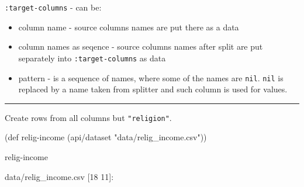 \documentclass[]{article}
\newenvironment{Shaded}{\begin{snugshade}}{\end{snugshade}}
\newcommand{\BuiltInTok}[1]{#1}
\newcommand{\FunctionTok}[1]{\textcolor[rgb]{0.00,0.00,0.00}{#1}}
\newcommand{\NormalTok}[1]{#1}
\newcommand{\StringTok}[1]{\textcolor[rgb]{0.31,0.60,0.02}{#1}}
\providecommand{\tightlist}{%
  \setlength{\itemsep}{0pt}\setlength{\parskip}{0pt}}
\begin{document}
\texttt{:target-columns} - can be:

\begin{itemize}
\tightlist
\item
  column name - source columns names are put there as a data
\item
  column names as seqence - source columns names after split are put
  separately into \texttt{:target-columns} as data
\item
  pattern - is a sequence of names, where some of the names are
  \texttt{nil}. \texttt{nil} is replaced by a name taken from splitter
  and such column is used for values.
\end{itemize}

\begin{center}\rule{0.5\linewidth}{0.5pt}\end{center}

Create rows from all columns but \texttt{"religion"}.

\begin{Shaded}
\begin{Highlighting}[]
\NormalTok{(}\BuiltInTok{def}\FunctionTok{ relig-income }\NormalTok{(api/dataset }\StringTok{"data/relig_income.csv"}\NormalTok{))}
\end{Highlighting}
\end{Shaded}

\begin{Shaded}
\begin{Highlighting}[]
\NormalTok{relig-income}
\end{Highlighting}
\end{Shaded}

data/relig\_income.csv {[}18 11{]}:
\end{document}
